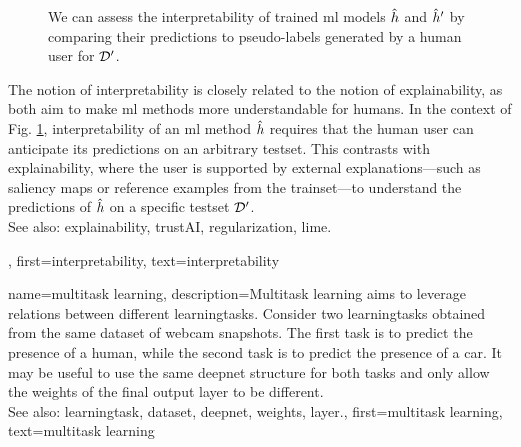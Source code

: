{{\begin{figure}[H]
\begin{center}
 			\caption{We can assess the interpretability of trained \gls{ml} \glspl{model} 
 			$\hat{h}$ and $\hat{h}'$ by comparing their \glspl{prediction} 
			to pseudo-\glspl{label} generated by a human user for $\mathcal{D}'$. 
			\label{fig_aug_simulatability_dict}}
 			\end{center}
	 	\end{figure} 
 	 	The notion of interpretability is closely related to the notion of \gls{explainability}, 
 	 	as both aim to make \gls{ml} methods more understandable for humans. 
		In the context of Fig. \ref{fig_aug_simulatability_dict}, interpretability of an \gls{ml} 
	 	method $\hat{h}$ requires that the human user can anticipate its \glspl{prediction} 
	 	on an arbitrary \gls{testset}. This contrasts with \gls{explainability}, where the user is supported by 
	 	external \glspl{explanation}—such as saliency \glspl{map} or reference examples from the \gls{trainset}—to 
		understand the \glspl{prediction} of $\hat{h}$ on a specific \gls{testset} $\mathcal{D}'$. 
	 	\\ 
	 	See also: \gls{explainability}, \gls{trustAI}, \gls{regularization}, \gls{lime}. },
	first={interpretability},
 	text={interpretability}
}

{name={multitask learning},
	description={Multitask learning aims to leverage relations between 
	 	different \glspl{learningtask}. Consider two \glspl{learningtask} obtained from the 
	 	same \gls{dataset} of webcam snapshots. The first task is to predict the presence 
	 	of a human, while the second task is to predict the presence of a car. It may be useful 
	 	to use the same \gls{deepnet} structure for both tasks and only allow the \gls{weights} of 
	 	the final output \gls{layer} to be different.
	 			\\ 
		See also: \gls{learningtask}, \gls{dataset}, \gls{deepnet}, \gls{weights}, \gls{layer}.},
	first={multitask learning},
	text={multitask learning}
}

